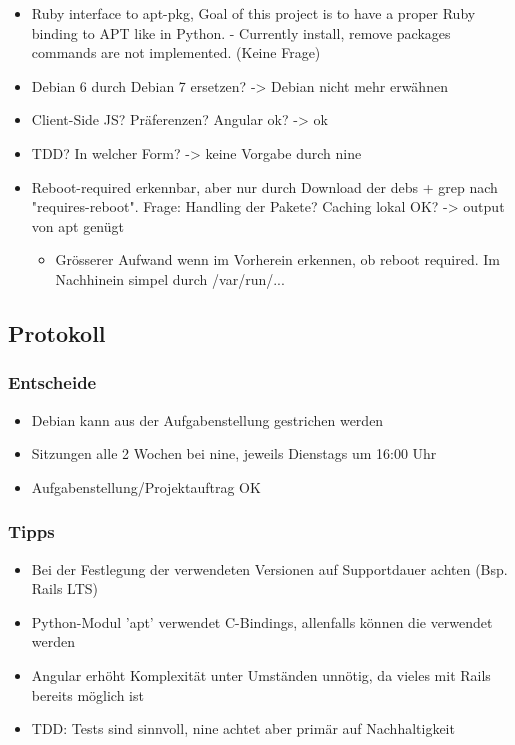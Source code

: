 \documentclass[class=scrbook,crop=false]{standalone}
\begin{document}
    \begin{itemize}
        \item Ruby interface to apt-pkg, Goal of this project is to have a proper Ruby binding to APT like in Python. - Currently install, remove packages commands are not implemented. (Keine Frage)
        \item Debian 6 durch Debian 7 ersetzen? -> Debian nicht mehr erwähnen
        \item Client-Side JS? Präferenzen? Angular ok? -> ok
        \item TDD? In welcher Form? -> keine Vorgabe durch nine
        \item Reboot-required erkennbar, aber nur durch Download der debs + grep nach "requires-reboot". Frage: Handling der Pakete? Caching lokal OK? -> output von apt genügt
        \begin{itemize}
            \item Grösserer Aufwand wenn im Vorherein erkennen, ob reboot required. Im Nachhinein simpel durch /var/run/...
        \end{itemize}
    \end{itemize}
    
    \subsection*{Protokoll}
    
    \subsubsection*{Entscheide}
    
    \begin{itemize}
        \item Debian kann aus der Aufgabenstellung gestrichen werden
        \item Sitzungen alle 2 Wochen bei nine, jeweils Dienstags um 16:00 Uhr
        \item Aufgabenstellung/Projektauftrag OK
    \end{itemize}
    
    \subsubsection*{Tipps}
    
	\begin{itemize}
        \item Bei der Festlegung der verwendeten Versionen auf Supportdauer achten (Bsp. Rails LTS)
        \item Python-Modul 'apt' verwendet C-Bindings, allenfalls können die verwendet werden
        \item Angular erhöht Komplexität unter Umständen unnötig, da vieles mit Rails bereits möglich ist
        \item TDD: Tests sind sinnvoll, nine achtet aber primär auf Nachhaltigkeit
    \end{itemize}
    
\end{document}

